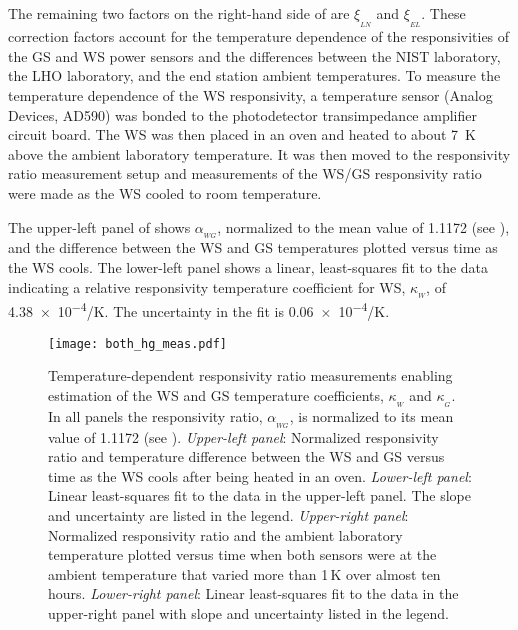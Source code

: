 \documentclass[12pt,a4paper,final]{iopart}
\begin{document}
The remaining two factors on the right-hand side of  are $\xi_{_{LN}}$ and $\xi_{_{EL}}$.  These correction factors account for the temperature dependence of the responsivities of the GS and WS power sensors and the  differences between the NIST laboratory, the LHO laboratory,  and the end station ambient temperatures.  To measure the temperature dependence of the WS responsivity, a temperature sensor (Analog Devices, AD590) was bonded to the photodetector transimpedance amplifier circuit board.  The WS was then placed in an oven and heated to about 7~K above the ambient laboratory temperature.  It was then moved to the responsivity ratio measurement setup and measurements of the WS/GS responsivity ratio were made as the WS cooled to room temperature.

The upper-left panel of  shows  $\alpha_{_{WG}}$, normalized to the mean value of 1.1172 (see ), and the difference between the WS and GS temperatures plotted versus time as the WS cools.  The lower-left panel shows a linear, least-squares fit to the data indicating a relative responsivity temperature coefficient for WS, $\kappa_{_{W}}$, of \num{4.38e-4}/K. The uncertainty in the fit is \num{0.06e-4}/K. 
%
\begin{figure}[t]
    \begin{center}
    \texttt{[image: both\_hg\_meas.pdf]}
    \caption{Temperature-dependent responsivity ratio measurements enabling estimation of the WS and GS temperature coefficients, $\kappa_{_W}$ and $\kappa_{_G}$. In all panels the responsivity ratio, $\alpha_{_{WG}}$, is normalized to its mean value of 1.1172 (see ). {\em Upper-left panel}: Normalized responsivity ratio and temperature difference between the WS and GS versus time as the WS cools after being heated in an oven.  {\em Lower-left panel}: Linear least-squares fit to the data in the upper-left panel.  The slope and uncertainty are listed in the legend.  {\em Upper-right panel}: Normalized responsivity ratio and the ambient laboratory temperature plotted versus time when both sensors were at the ambient temperature that varied more than 1\,K over almost ten hours.  {\em Lower-right panel}: Linear least-squares fit to the data in the upper-right panel with slope and uncertainty listed in the legend.}
    \label{fig:tempV1}
    \end{center}
\end{figure}
%
\end{document}
